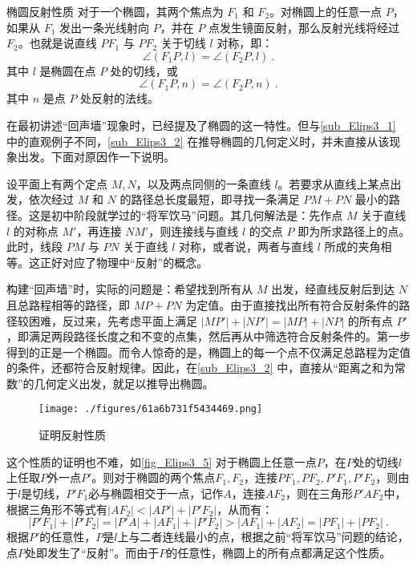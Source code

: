 \begin{theorem}{椭圆反射性质}
对于一个椭圆，其两个焦点为 $F_1$ 和 $F_2$。对椭圆上的任意一点 $P$，如果从 $F_1$ 发出一条光线射向 $P$，并在 $P$ 点发生镜面反射，那么反射光线将经过 $F_2$。也就是说直线 $PF_1$ 与 $PF_2$ 关于切线 $l$ 对称，即：
\begin{equation}
\angle (F_1P, l) = \angle (F_2P, l)~.
\end{equation}
其中 $l$ 是椭圆在点 $P$ 处的切线，或
\begin{equation}
\angle (F_1P, n) = \angle (F_2P, n)~.
\end{equation}
其中 $n$ 是点 $P$ 处反射的法线。
\end{theorem}

在最初讲述“回声墙”现象时，已经提及了椭圆的这一特性。但与\autoref{sub_Elips3_1} 中的直观例子不同，\autoref{sub_Elips3_2} 在推导椭圆的几何定义时，并未直接从该现象出发。下面对原因作一下说明。

设平面上有两个定点 $M,N$，以及两点同侧的一条直线 $l$。若要求从直线上某点出发，依次经过 $M$ 和 $N$ 的路径总长度最短，即寻找一条满足 $PM + PN$ 最小的路径。这是初中阶段就学过的“将军饮马”问题。其几何解法是：先作点 $M$ 关于直线 $l$ 的对称点 $M'$，再连接 $NM'$，则连接线与直线 $l$ 的交点 $P$ 即为所求路径上的点。此时，线段 $PM$ 与 $PN$ 关于直线 $l$ 对称，或者说，两者与直线 $l$ 所成的夹角相等。这正好对应了物理中“反射”的概念。

构建“回声墙”时，实际的问题是：希望找到所有从 $M$ 出发，经直线反射后到达 $N$ 且总路程相等的路径，即 $MP + PN$ 为定值。由于直接找出所有符合反射条件的路径较困难，反过来，先考虑平面上满足 $|MP'| + |NP'| = |MP| + |NP|$ 的所有点 $P'$，即满足两段路径长度之和不变的点集，然后再从中筛选符合反射条件的。第一步得到的正是一个椭圆。而令人惊奇的是，椭圆上的每一个点不仅满足总路程为定值的条件，还都符合反射规律。因此，在\autoref{sub_Elips3_2} 中，直接从“距离之和为常数”的几何定义出发，就足以推导出椭圆。

\begin{figure}[ht]
\centering
\texttt{[image: ./figures/61a6b731f5434469.png]}
\caption{证明反射性质} \label{fig_Elips3_5}
\end{figure}

这个性质的证明也不难，如\autoref{fig_Elips3_5} 对于椭圆上任意一点$P$，在$P$处的切线$l$上任取$P$外一点$P'$。则对于椭圆的两个焦点$F_1,F_2$，连接$PF_1,PF_2,P'F_1,P'F_2$，则由于$l$是切线，$P'F_1$必与椭圆相交于一点，记作$A$，连接$AF_2$，则在三角形$P'AF_2$中，根据三角形不等式有$|AF_2|<|AP'|+|P'F_2|$，从而有：
\begin{equation}
|P'F_1|+|P'F_2|=|P'A|+|AF_1|+|P'F_2|>|AF_1|+|AF_2|=|PF_1|+|PF_2|~.
\end{equation}
根据$P'$的任意性，$P$是$l$上与二者连线最小的点，根据之前“将军饮马”问题的结论，点$P$处即发生了“反射”。而由于$P$的任意性，椭圆上的所有点都满足这个性质。


